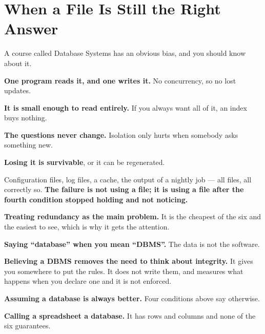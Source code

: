 \section{When a File Is Still the Right Answer}

A course called Database Systems has an obvious bias, and you should know
about it.

\begin{conceptbox}
\begin{tight}
  \item \textbf{One program reads it, and one writes it.} No concurrency, so
        no lost updates.
  \item \textbf{It is small enough to read entirely.} If you always want all of
        it, an index buys nothing.
  \item \textbf{The questions never change.} Isolation only hurts when somebody
        asks something new.
  \item \textbf{Losing it is survivable}, or it can be regenerated.
\end{tight}

\smallskip
Configuration files, log files, a cache, the output of a nightly job --- all
files, all correctly so. \textbf{The failure is not using a file; it is using a
file after the fourth condition stopped holding and not noticing.}
\end{conceptbox}

\begin{pitfall}
\begin{tight}
  \item \textbf{Treating redundancy as the main problem.} It is the cheapest of
        the six and the easiest to see, which is why it gets the attention.
  \item \textbf{Saying ``database'' when you mean ``DBMS''.} The data is not
        the software.
  \item \textbf{Believing a DBMS removes the need to think about integrity.}
        It gives you somewhere to put the rules. It does not write them, and
         measures what happens when you declare one and it
        is not enforced.
  \item \textbf{Assuming a database is always better.} Four conditions above
        say otherwise.
  \item \textbf{Calling a spreadsheet a database.} It has rows and columns and
        none of the six guarantees.
\end{tight}
\end{pitfall}

